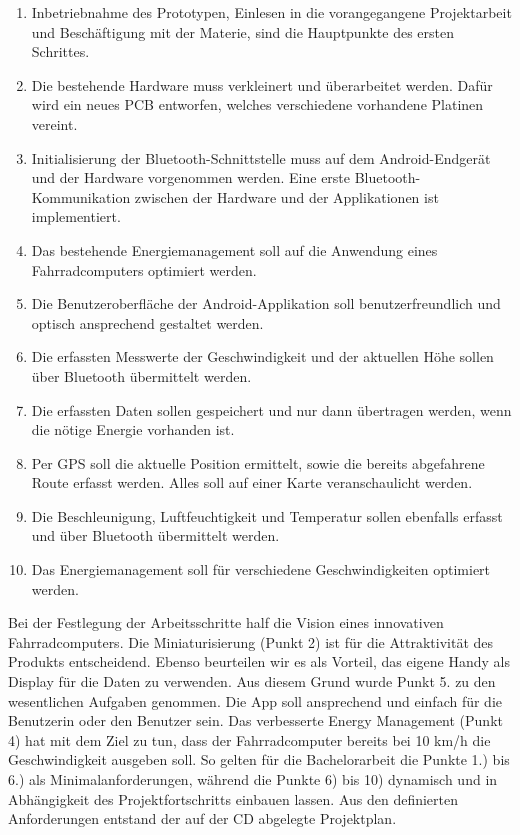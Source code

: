 \begin{enumerate} 

\item Inbetriebnahme des Prototypen, Einlesen in die vorangegangene Projektarbeit und Beschäftigung mit der Materie, sind die Hauptpunkte des ersten Schrittes.
\item Die bestehende Hardware muss verkleinert und überarbeitet werden. Dafür wird ein neues PCB entworfen, welches verschiedene vorhandene Platinen vereint.
\item Initialisierung der Bluetooth-Schnittstelle muss auf dem Android-Endgerät und der Hardware vorgenommen werden. Eine erste Bluetooth-Kommunikation zwischen der Hardware und der Applikationen ist implementiert.
\item Das bestehende Energiemanagement soll auf die Anwendung eines Fahrradcomputers optimiert werden.
\item Die Benutzeroberfläche der Android-Applikation soll benutzerfreundlich und optisch ansprechend gestaltet werden.
\item Die erfassten Messwerte der Geschwindigkeit und der aktuellen Höhe sollen über Bluetooth übermittelt werden.
\item	Die erfassten Daten sollen gespeichert und nur dann übertragen werden, wenn die nötige Energie vorhanden ist.
\item	Per GPS soll die aktuelle Position ermittelt, sowie die bereits abgefahrene Route erfasst werden. Alles soll auf einer Karte veranschaulicht werden.
\item	Die Beschleunigung, Luftfeuchtigkeit und Temperatur sollen ebenfalls erfasst und über Bluetooth übermittelt werden.
\item	Das Energiemanagement soll für verschiedene Geschwindigkeiten optimiert werden.
\end{enumerate}

Bei der Festlegung der Arbeitsschritte half die Vision eines innovativen Fahrradcomputers. Die Miniaturisierung (Punkt 2) ist für die Attraktivität des Produkts entscheidend. Ebenso beurteilen wir es als Vorteil, das eigene Handy als Display für die Daten zu verwenden. Aus diesem Grund wurde Punkt 5. zu den wesentlichen Aufgaben genommen. Die App soll ansprechend und einfach für die Benutzerin oder den Benutzer sein. Das verbesserte Energy Management (Punkt 4) hat mit dem Ziel zu tun, dass der Fahrradcomputer bereits bei 10 km/h die Geschwindigkeit ausgeben soll. So gelten für die Bachelorarbeit die Punkte 1.) bis 6.) als Minimalanforderungen, während die Punkte 6) bis 10) dynamisch und in Abhängigkeit des Projektfortschritts einbauen lassen. Aus den definierten Anforderungen entstand der auf der CD abgelegte Projektplan.

